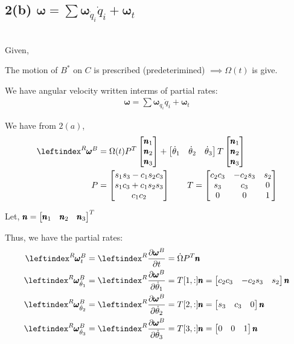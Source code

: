 \subsection{2(b) $\pmb \omega = \sum \pmb \omega_{\dot q_i} \dot q_i +  \pmb \omega_t$}

\\

Given,

The motion of $B^*$ on $C$ is prescribed (predeterimined) $\implies \Omega(t)$ is give.

We have angular velocity written interms of partial rates:
\begin{align*}
    \pmb \omega = \sum \pmb \omega_{\dot q_i} \dot q_i +  \pmb \omega_t
\end{align*}

We have from $2(a)$,
\begin{align*}
    \lx{^R}{\pmb \omega}^B &=
    \Omega(t) P^T  \bm{\pmb n_1 \\ \pmb n_2 \\ \pmb n_3}
        + \bm{\dot \theta_1 & \dot \theta_2 & \dot \theta_3} T \bm{\pmb n_1 \\ \pmb n_2 \\ \pmb n_3}\\
    P &= \bm{s_1 s_3 - c_1s_2c_3 \\ s_1c_3 + c_1 s_2 s_3 \\ c_1 c_2} \qquad
    T = \bm{c_2 c_3 & -c_2 s_3 & s_2\\
             s_3     & c_3      & 0\\
             0       & 0        & 1}
\end{align*}

Let, $\pmb n = \begin{bmatrix} \pmb n_1 & \pmb n_2 & \pmb n_3 \end{bmatrix}^T$

Thus, we have the partial rates:
\begin{align*}
    \lx{^R}{\pmb \omega}^B_t &= \lx{^R}{\frac{\partial \pmb \omega^B}{\partial t}} = \dot \Omega P^T \pmb n\\
    \lx{^R}{\pmb \omega}^B_{\dot \theta_1} &= \lx{^R}{\frac{\partial \pmb \omega^B}{\partial \dot \theta_1}} = T[1,:] \pmb n = \bm{c_2 c_3 & -c_2 s_3 & s_2} \pmb n\\
    \lx{^R}{\pmb \omega}^B_{\dot \theta_2} &= \lx{^R}{\frac{\partial \pmb \omega^B}{\partial \dot \theta_2}} = T[2,:] \pmb n = \bm{s_3     & c_3      & 0} \pmb n\\
    \lx{^R}{\pmb \omega}^B_{\dot \theta_3} &= \lx{^R}{\frac{\partial \pmb \omega^B}{\partial \dot \theta_3}} = T[3,:] \pmb n = \bm{0&0&1} \pmb n\\
\end{align*}
